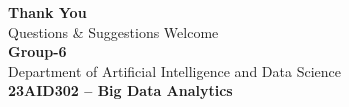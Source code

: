 \documentclass[aspectratio=169]{beamer}
\begin{document}
\begin{frame}[plain]
  \vfill
  \begin{center}
    {\Huge \bfseries \color{praveenred} Thank You}\\[12pt]
    {\large Questions \& Suggestions Welcome}\\[16pt]
    {\small \bfseries Group-6}\\[4pt]
    {\small Department of Artificial Intelligence and Data Science}\\[2pt]
    {\small \textbf{23AID302 -- Big Data Analytics}}
  \end{center}
  \vfill
\end{frame}
\end{document}
